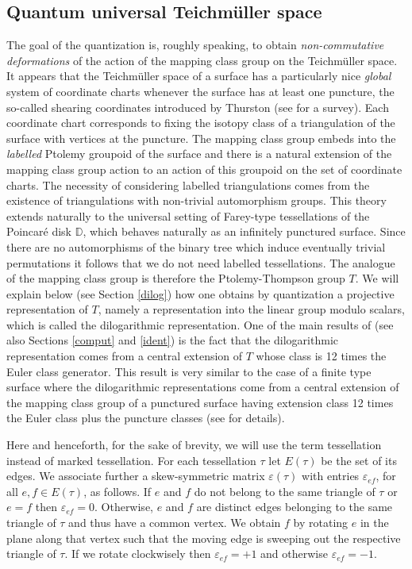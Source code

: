 \documentclass[twoside]{irmaems}
\theoremstyle{plain}
\theoremstyle{definition}
\theoremstyle{remark}
\begin{document}
\subsection{Quantum universal Teichm\"uller space}
The goal of the quantization is, roughly speaking, 
to obtain {\em non-commutative deformations} of the action 
of the mapping class group on the Teichm\"uller space.  
It appears that the Teichm\"uller space of a surface 
has a particularly nice  {\em global} system of coordinate charts 
whenever the surface has at least one puncture, 
the so-called shearing coordinates introduced by Thurston 
(see \cite{Fun} for a survey). Each coordinate chart corresponds to 
fixing the isotopy class of a triangulation of the surface with 
vertices at the puncture. The mapping class group embeds into the 
{\em labelled} Ptolemy groupoid of the surface and there is a natural 
extension of the mapping class group action to 
an action of this groupoid on the set of coordinate charts. 
The necessity of considering labelled triangulations comes from the 
existence of triangulations with non-trivial automorphism groups. 
This theory extends naturally to the universal setting of  
Farey-type tessellations of the Poincar\'e disk ${\mathbb D}$, which behaves 
naturally as an infinitely punctured surface. Since there are no 
automorphisms of the binary tree which  induce eventually trivial 
permutations it follows that we do not need labelled tessellations.  
The analogue of the mapping class group is therefore  
the Ptolemy-Thompson group $T$. We will explain below (see Section \ref{dilog}) how one obtains by quantization a projective representation of 
$T$, namely a representation into the linear group modulo scalars, which is 
called the dilogarithmic representation.  
One of the main results of \cite{fu-se} (see also Sections \ref{comput} 
and \ref{ident}) is the fact that 
the dilogarithmic representation comes from a central extension 
of $T$ whose class is 12 times the Euler class generator. 
This result is very similar to the case of a finite type surface where 
the dilogarithmic representations come from a central extension of the 
mapping class group of a punctured surface having extension class 
12 times the Euler class plus the puncture classes (see \cite{fu-kas} 
for details). 



\vspace{0.1cm}\noindent 
Here and henceforth, for the sake of brevity, 
we will use the term tessellation instead of marked tessellation. 
For each tessellation $\tau$ let $E(\tau)$ be the set of its edges. 
We associate further a skew-symmetric 
matrix  $\varepsilon(\tau)$ with entries $\varepsilon_{ef}$,  for all $e,f\in E(\tau)$, 
as follows. If $e$ and $f$ do not belong to the same triangle of $\tau$ or $e=f$  then 
$\varepsilon_{ef}=0$. Otherwise, $e$ and $f$  are distinct edges belonging 
to the same triangle of $\tau$ and thus have a common vertex. 
We obtain $f$ by rotating $e$  in the plane along that vertex 
such that the moving edge  is sweeping out the  respective triangle of $\tau$. 
If we rotate  clockwisely then $\varepsilon_{ef}=+1$ and otherwise  
$\varepsilon_{ef}=-1$. 
\end{document}
